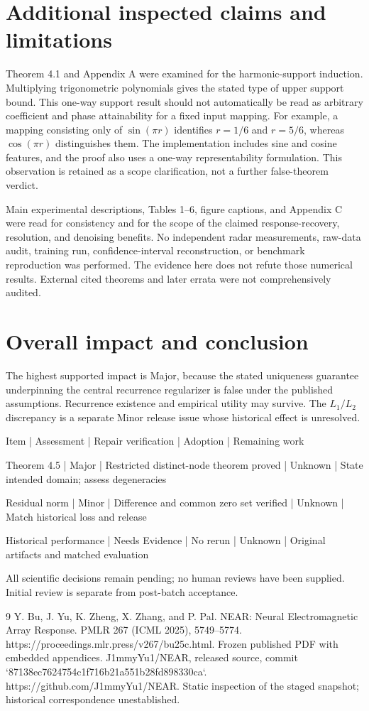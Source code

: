 \documentclass[10pt]{article}
\begin{document}
\section*{Additional inspected claims and limitations}
Theorem 4.1 and Appendix A were examined for the harmonic-support induction. Multiplying trigonometric polynomials gives the stated type of upper support bound. This one-way support result should not automatically be read as arbitrary coefficient and phase attainability for a fixed input mapping. For example, a mapping consisting only of \(\sin(\pi r)\) identifies \(r=1/6\) and \(r=5/6\), whereas \(\cos(\pi r)\) distinguishes them. The implementation includes sine and cosine features, and the proof also uses a one-way representability formulation. This observation is retained as a scope clarification, not a further false-theorem verdict.\par
Main experimental descriptions, Tables 1–6, figure captions, and Appendix C were read for consistency and for the scope of the claimed response-recovery, resolution, and denoising benefits. No independent radar measurements, raw-data audit, training run, confidence-interval reconstruction, or benchmark reproduction was performed. The evidence here does not refute those numerical results. External cited theorems and later errata were not comprehensively audited.\par
\section*{Overall impact and conclusion}
The highest supported impact is Major, because the stated uniqueness guarantee underpinning the central recurrence regularizer is false under the published assumptions. Recurrence existence and empirical utility may survive. The \(L_1/L_2\) discrepancy is a separate Minor release issue whose historical effect is unresolved.\par
Item | Assessment | Repair verification | Adoption | Remaining work\par
Theorem 4.5 | Major | Restricted distinct-node theorem proved | Unknown | State intended domain; assess degeneracies\par
Residual norm | Minor | Difference and common zero set verified | Unknown | Match historical loss and release\par
Historical performance | Needs Evidence | No rerun | Unknown | Original artifacts and matched evaluation\par
All scientific decisions remain pending; no human reviews have been supplied. Initial review is separate from post-batch acceptance.\par
9 Y. Bu, J. Yu, K. Zheng, X. Zhang, and P. Pal. NEAR: Neural Electromagnetic Array Response. PMLR 267 (ICML 2025), 5749–5774. https://proceedings.mlr.press/v267/bu25c.html. Frozen published PDF with embedded appendices. J1mmyYu1/NEAR, released source, commit `87138ec7624754c1f716b21a551b28fd898330ca`. https://github.com/J1mmyYu1/NEAR. Static inspection of the staged snapshot; historical correspondence unestablished.\par
\end{document}
